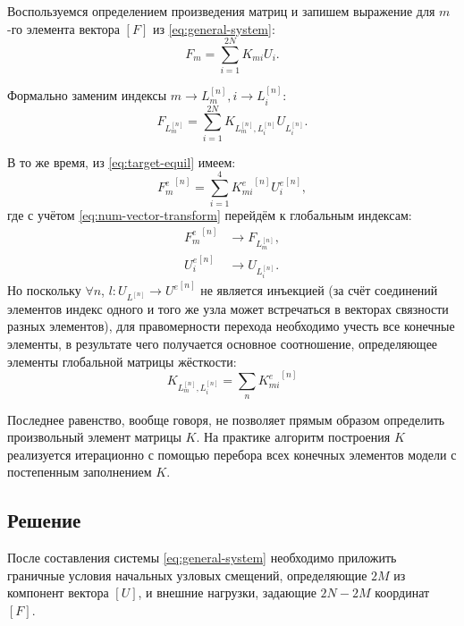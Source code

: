 \documentclass[10pt]{article}
\numberwithin{equation}{section}
\newcommand{\matr}[1]{[#1]}
\begin{document}
Воспользуемся определением произведения матриц и запишем выражение для
$m$-го элемента вектора $\matr{F}$ из \eqref{eq:general-system}:
\begin{equation*}
  F_m = \sum_{i=1}^{2N}{K_{mi}U_i}.
\end{equation*}

Формально заменим индексы $m \to L_m^{[n]}, i \to L_i^{[n]}$:
\begin{equation}
  F_{L_m^{[n]}} = \sum_{i=1}^{2N}{K_{{L_m^{[n]}},{L_i^{[n]}}}{U_{L_i^{[n]}}}}.
\end{equation}

В то же время, из \eqref{eq:target-equil} имеем:
\begin{equation}
  \label{eq:target-equil-prod}
  {F_m^e}^{[n]} = \sum_{i=1}^4{{K_{mi}^e}^{[n]}{U_i^e}^{[n]}},
\end{equation}
где с учётом \eqref{eq:num-vector-transform} перейдём к глобальным
индексам:
\begin{align*}
  {F_m^e}^{[n]} &\to F_{L_m^{[n]}},\\
  {U_i^e}^{[n]} &\to U_{L_i^{[n]}}.
\end{align*}
Но поскольку $\forall n$, $l\colon U_{L^{[n]}} \to {U^e}^{[n]}$ не
является инъекцией (за счёт соединений элементов индекс одного и того
же узла может встречаться в векторах связности разных элементов), для
правомерности перехода необходимо учесть все конечные элементы, в
результате чего получается основное соотношение, определяющее элементы
глобальной матрицы жёсткости:
\begin{equation}
  \label{eq:global-stiffness}
  K_{L_m^{[n]},{L_i^{[n]}}} = \sum_n{{K_{mi}^e}^{[n]}}
\end{equation}

Последнее равенство, вообще говоря, не позволяет прямым образом
определить произвольный элемент матрицы $K$. На практике алгоритм
построения $K$ реализуется итерационно с помощью перебора всех
конечных элементов модели с постепенным заполнением $K$.

\subsection{Решение}

После составления системы \eqref{eq:general-system} необходимо
приложить граничные условия начальных узловых смещений, определяющие
$2M$ из компонент вектора $\matr{U}$, и внешние нагрузки, задающие
$2N-2M$ координат $\matr{F}$.
\end{document}
